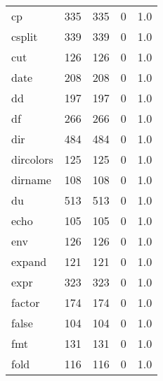 \begin{longtable}{lrrrr}
cp        &                     335 &              335 &                 0 &                          1.0 \\
csplit    &                     339 &              339 &                 0 &                          1.0 \\
cut       &                     126 &              126 &                 0 &                          1.0 \\
date      &                     208 &              208 &                 0 &                          1.0 \\
dd        &                     197 &              197 &                 0 &                          1.0 \\
df        &                     266 &              266 &                 0 &                          1.0 \\
dir       &                     484 &              484 &                 0 &                          1.0 \\
dircolors &                     125 &              125 &                 0 &                          1.0 \\
dirname   &                     108 &              108 &                 0 &                          1.0 \\
du        &                     513 &              513 &                 0 &                          1.0 \\
echo      &                     105 &              105 &                 0 &                          1.0 \\
env       &                     126 &              126 &                 0 &                          1.0 \\
expand    &                     121 &              121 &                 0 &                          1.0 \\
expr      &                     323 &              323 &                 0 &                          1.0 \\
factor    &                     174 &              174 &                 0 &                          1.0 \\
false     &                     104 &              104 &                 0 &                          1.0 \\
fmt       &                     131 &              131 &                 0 &                          1.0 \\
fold      &                     116 &              116 &                 0 &                          1.0 \\

\end{longtable}
